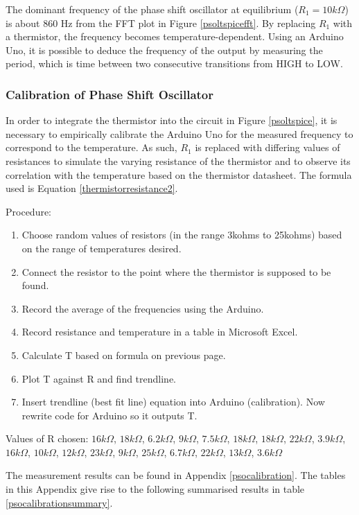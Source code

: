 The dominant frequency of the phase shift oscillator at equilibrium ($R_1 = 10k \Omega$) is about 860 Hz from the FFT plot in Figure \ref{psoltspicefft}. By replacing $R_1$ with a thermistor, the frequency becomes temperature-dependent. Using an Arduino Uno, it is possible to deduce the frequency of the output by measuring the period, which is time between two consecutive transitions from HIGH to LOW.  


\subsubsection{Calibration of Phase Shift Oscillator}

In order to integrate the thermistor into the circuit in Figure \ref{psoltspice}, it is necessary to empirically calibrate the Arduino Uno for the measured frequency to correspond to the temperature.  As such, $R_1$ is replaced with differing values of resistances to simulate the varying resistance of the thermistor and to observe its correlation with the temperature based on the thermistor datasheet. The formula used is Equation \ref{thermistorresistance2}. 

Procedure: 
\begin{enumerate}
\item Choose random values of resistors (in the range 3kohms to 25kohms) based on the range of temperatures desired.  
\item Connect the resistor to the point where the thermistor is supposed to be found.  
\item Record the average of the frequencies using the Arduino.  
\item Record resistance and temperature in a table in Microsoft Excel.  
\item Calculate T based on formula on previous page.  
\item Plot T against R and find trendline.  
\item Insert trendline (best fit line) equation into Arduino (calibration). Now rewrite code for Arduino so it outputs T. 
\end{enumerate} 

Values of R chosen: $16k\Omega$, $18k\Omega$, $6.2k\Omega$, $9k\Omega$, $7.5k\Omega$, $18k\Omega$, $18k\Omega$, $22k\Omega$, $3.9k\Omega$, $16k\Omega$, $10k\Omega$, $12k\Omega$, $23k\Omega$, $9k\Omega$, $25k\Omega$, $6.7k\Omega$, $22k\Omega$, $13k\Omega$, $3.6k\Omega $

The measurement results can be found in Appendix \ref{psocalibration}. The tables in this Appendix give rise to the following summarised results in table \ref{psocalibrationsummary}. 

